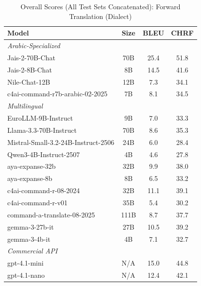 \begin{table}[htbp]
\centering
\caption{Overall Scores (All Test Sets Concatenated): Forward Translation (Dialect)}
\label{tab:overall_scores_forward_dialect}
\begin{tabular}{l@{\hspace{3pt}}c@{\hspace{3pt}}c@{\hspace{3pt}}c}
\toprule
Model & Size & BLEU & CHRF \\
\midrule
\multicolumn{4}{l}{\textit{Arabic-Specialized}} \\
\midrule
Jais-2-70B-Chat & 70B & 25.4 & 51.8 \\
Jais-2-8B-Chat & 8B & 14.5 & 41.6 \\
Nile-Chat-12B & 12B & 7.3 & 34.1 \\
c4ai-command-r7b-arabic-02-2025 & 7B & 8.1 & 34.5 \\
\midrule
\multicolumn{4}{l}{\textit{Multilingual}} \\
\midrule
EuroLLM-9B-Instruct & 9B & 7.0 & 33.3 \\
Llama-3.3-70B-Instruct & 70B & 8.6 & 35.3 \\
Mistral-Small-3.2-24B-Instruct-2506 & 24B & 6.0 & 28.4 \\
Qwen3-4B-Instruct-2507 & 4B & 4.6 & 27.8 \\
aya-expanse-32b & 32B & 9.9 & 38.0 \\
aya-expanse-8b & 8B & 6.5 & 33.2 \\
c4ai-command-r-08-2024 & 32B & 11.1 & 39.1 \\
c4ai-command-r-v01 & 35B & 5.4 & 30.2 \\
command-a-translate-08-2025 & 111B & 8.7 & 37.7 \\
gemma-3-27b-it & 27B & 10.5 & 39.2 \\
gemma-3-4b-it & 4B & 7.1 & 32.7 \\
\midrule
\multicolumn{4}{l}{\textit{Commercial API}} \\
\midrule
gpt-4.1-mini & N/A & 15.0 & 44.8 \\
gpt-4.1-nano & N/A & 12.4 & 42.1 \\
\midrule
\bottomrule
\end{tabular}
\end{table}